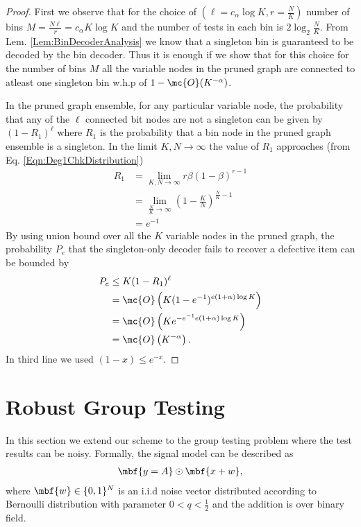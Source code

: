 \documentclass[conference,twocolumn]{IEEEtran}
\begin{document}
\begin{proof}
First we observe that for the choice of $(\ell=c_\alpha \log K,r=\frac{N}{K})$ number of bins $M=\frac{N\ell}{r}=c_\alpha K \log K$ and the number of tests in each bin is $2\log_2 \frac{N}{K}$. From Lem. \ref{Lem:BinDecoderAnalysis} we know that a singleton bin is guaranteed to be decoded by the bin decoder. Thus it is enough if we show that for this choice for the number of bins $M$ all the variable nodes in the pruned graph are connected to atleast one singleton bin w.h.p of $1-\mc{O}(K^{-\alpha})$.

In the pruned graph ensemble, for any particular variable node, the probability that any of the $\ell$ connected bit nodes are not a singleton can be given by $(1-R_1)^\ell$ where $R_1$ is the probability that a bin node in the pruned graph ensemble is a singleton. In the limit $K,N\rightarrow \infty$ the value of $R_1$ approaches (from Eq. \ref{Eqn:Deg1ChkDistribution})
\begin{align*}
R_1&=\lim _{K,N\rightarrow\infty}r\beta(1-\beta)^{r-1}\\
     &=\lim _{\frac{N}{K}\rightarrow\infty}\left(1-\frac{K}{N}\right)^{\frac{N}{K}-1}\\
     &= e^{-1}
\end{align*} 
By using union bound over all the $K$ variable nodes in the pruned graph, the probability $P_e$ that the singleton-only decoder fails to recover a defective item can be bounded by
\begin{align*}
P_e&\leq K(1-R_1)^\ell \\
&=\mc{O}\left(K(1-e^{-1})^{e(1+\alpha)\log K}\right)\\
&=\mc{O}\left(Ke^{-e^{-1}e(1+\alpha)\log K}\right)\\
&=\mc{O}\left(K^{-\alpha}\right).
\end{align*}
In third line we used $(1-x)\leq e^{-x}$.
\end{proof}

\section{Robust Group Testing}
\label{Sec:NoisyGroupTesting}
In this section we extend our scheme to the group testing problem where the test results can be noisy. Formally, the signal model can be described as 
\begin{align*}
\mbf{y=A}\odot \mbf{x+w},
\end{align*}
where $\mbf{w}\in\{0,1\}^N$ is an i.i.d noise vector distributed according to Bernoulli distribution with parameter $0<q<\frac{1}{2}$ and the addition is over binary field.
\end{document}
